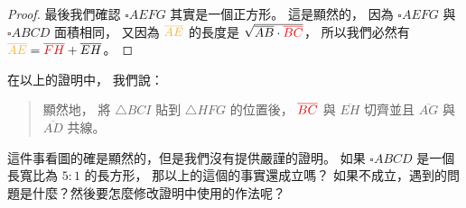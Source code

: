 \documentclass{article}
\begin{document}
\begin{multicols}{2}
\begin{proof}
	最後我們確認 $\square{AEFG}$ 其實是一個正方形。
	這是顯然的，
	因為 $\square{AEFG}$ 與 $\square{ABCD}$ 面積相同，
	又因為 $\yellow{\overline{AE}}$ 的長度是 $\sqrt{\overline{AB}\cdot\red{\overline{BC}}}$，
	所以我們必然有 $\yellow{\overline{AE}}=\red{\overline{FH}}+\overline{EH}$。
\end{proof}

\begin{remark}
	在以上的證明中，
	我們說：
	\begin{quote}
		顯然地，
		將 $\triangle{BCI}$ 貼到 $\triangle{HFG}$ 的位置後，
		$\red{\overline{BC}}$ 與 $\overline{EH}$ 切齊並且
		$\overline{AG}$ 與 $\overline{AD}$ 共線。
	\end{quote}
	這件事看圖的確是顯然的，但是我們沒有提供嚴謹的證明。
	如果 $\square{ABCD}$ 是一個長寬比為 $5:1$ 的長方形，
	那以上的這個的事實還成立嗎？
	如果不成立，遇到的問題是什麼？然後要怎麼修改證明中使用的作法呢？
\end{remark}


\end{multicols}
\end{document}
